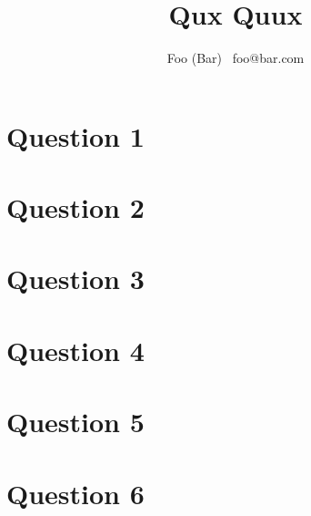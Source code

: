\documentclass{article}
\title{Qux Quux}
\author{Foo (Bar) \ foo@bar.com}
\begin{document}
\maketitle
\newpage
{}
\begin{comment}
  We want numbering to match the TMA format.
  Some helpful info here:
  https://tex.stackexchange.com/questions/3177/how-to-change-the-numbering-of-part-chapter-section-to-alphabetical-r
\end{comment}
\renewcommand{\thesection}{}
\renewcommand\thesubsection{\alph{subsection})}
\renewcommand\thesubsubsection{\roman{subsubsection})}
\makeatletter
\def\@seccntformat#1{\csname #1ignore\expandafter\endcsname\csname the#1\endcsname\quad}
\let\sectionignore\@gobbletwo
\let\latex@numberline\numberline
\def\numberline#1{\if\relax#1\relax\else\latex@numberline{#1}\fi}
\makeatother

\section{Question 1}
\pagebreak
\section{Question 2}
\pagebreak
\section{Question 3}
\pagebreak
\section{Question 4}
\pagebreak
\section{Question 5}
\pagebreak
\section{Question 6}
\pagebreak
\end{document}

